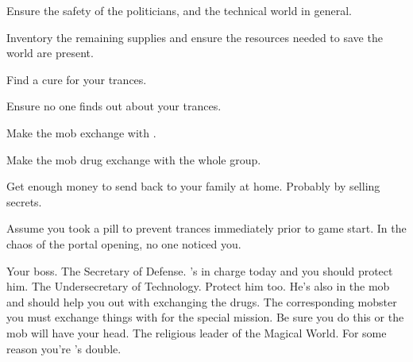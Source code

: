 \documentclass[char]{guildcamp3}
\begin{document}

\begin{itemz}[Goals]
  \item Ensure the safety of the politicians, and the technical world in general.
  \item Inventory the remaining supplies and ensure the resources needed to save the world are present.
  \item Find a cure for your trances.
  \item Ensure no one finds out about your trances.
  \item Make the mob exchange with \cServant{\informal}.
  \item Make the mob drug exchange with the whole group.
  \item Get enough money to send back to your family at home. Probably by selling secrets.
\end{itemz}

\begin{itemz}[Notes]
  \item Assume you took a pill to prevent trances immediately prior to game start. In the chaos of the portal opening, no one noticed you. 
\end{itemz}


\begin{contacts}
  \contact{\cSpecOpOne{}} Your boss.
  \contact{\cPoliOne{}} The Secretary of Defense. 's in charge today and you should protect him.
  \contact{\cPoliTwo{}} The Undersecretary of Technology. Protect him too. He's also in the mob and should help you out with exchanging the drugs. 
  \contact{\cServant{}} The corresponding mobster you must exchange things with for the special mission. Be sure you do this or the mob will have your head.
  \contact{\cPaladin{}} The religious leader of the Magical World. For some reason you're \cPaladin{}'s double. 
\end{contacts}
\end{document}

